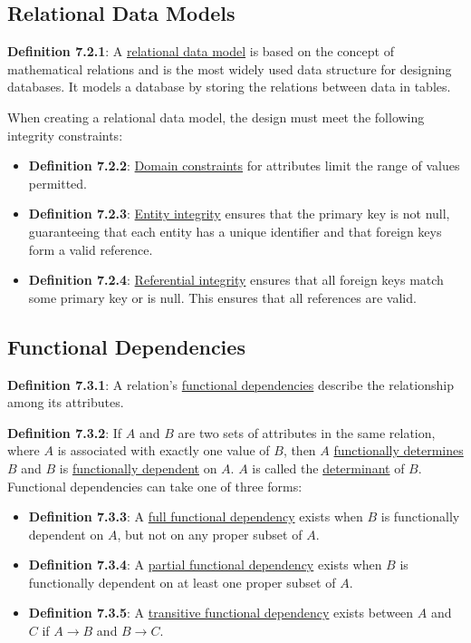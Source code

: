\documentclass{article}
\newcommand{\separate}[1] {\vspace{#1 pt}\noindent}
\newcommand{\definition}[2]{\textbf{Definition #1}: #2\label{def:#1}}
\begin{document}
\subsection{Relational Data Models}

\definition{7.2.1}{A \underline{relational data model} is based on the concept of mathematical relations and is the most widely used data structure for designing databases. It models a database by storing the relations between data in tables.}

\separate{5}When creating a relational data model, the design must meet the following integrity constraints:
\begin{itemize}
    \item \definition{7.2.2}{\underline{Domain constraints} for attributes limit the range of values permitted.}
    \item \definition{7.2.3}{\underline{Entity integrity} ensures that the primary key is not null, guaranteeing that each entity has a unique identifier and that foreign keys form a valid reference.}
    \item \definition{7.2.4}{\underline{Referential integrity} ensures that all foreign keys match some primary key or is null. This ensures that all references are valid.}
\end{itemize}

\subsection{Functional Dependencies}

\definition{7.3.1}{A relation's \underline{functional dependencies} describe the relationship among its attributes.}

\separate{5}\definition{7.3.2}{If \(A\) and \(B\) are two sets of attributes in the same relation, where \(A\) is associated with exactly one value of \(B\), then \(A\) \underline{functionally determines} \(B\) and \(B\) is \underline{functionally dependent} on \(A\). \(A\) is called the \underline{determinant} of \(B\). Functional dependencies can take one of three forms:}
\begin{itemize}
    \item \definition{7.3.3}{A \underline{full functional dependency} exists when \(B\) is functionally dependent on \(A\), but not on any proper subset of \(A\).}
    \item \definition{7.3.4}{A \underline{partial functional dependency} exists when \(B\) is functionally dependent on at least one proper subset of \(A\).}
    \item \definition{7.3.5}{A \underline{transitive functional dependency} exists between \(A\) and \(C\) if \(A \rightarrow B\) and \(B \rightarrow C\).}
\end{itemize}
\end{document}
